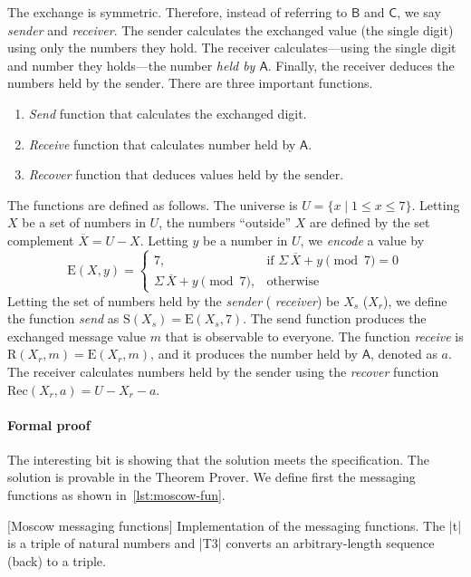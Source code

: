 The exchange is symmetric. Therefore, instead of referring to \(\mathsf{B}\) and
\(\mathsf{C}\), we say \emph{sender} and \emph{receiver}. The sender calculates
the exchanged value (the single digit) using only the numbers they hold. The
receiver calculates---using the single digit and number they holds---the number
\emph{held by \(\mathsf{A}\)}. Finally, the receiver deduces the numbers held by
the sender. There are three important functions.
\begin{enumerate}
\item \emph{Send} function that calculates the exchanged digit.
\item \emph{Receive} function that calculates number held by \(\mathsf{A}\).
\item \emph{Recover} function that deduces values held by the sender.
\end{enumerate}

The functions are defined as follows. The universe is \(U = \{ x \mid 1 \leq x
\leq 7 \}\). Letting \(X\) be a set of numbers in \(U\), the numbers
\enquote{outside} \(X\) are defined by the set complement \(\overline{X} = U -
X\). Letting \(y\) be a number in \(U\), we \emph{encode} a value by
\[\text{E}(X, y) = \begin{cases} 7, & \text{if } \Sigma\,\overline{X} +
y\pmod{7} = 0 \\ \Sigma\,\overline{X} + y\pmod{7}, & \text{otherwise}
\end{cases}\] Letting the set of numbers held by the \emph{sender} (\resp
\emph{receiver}) be \(X_s\) (\resp \(X_r\)), we define the function \emph{send}
as \(\text{S}(X_s) = \text{E}(X_s, 7)\). The send function produces the
exchanged message value \(m\) that is observable to everyone. The function
\emph{receive} is \(\text{R}(X_r,m) = \text{E}(X_r, m)\), and it produces the
number held by \(\mathsf{A}\), denoted as \(a\). The receiver calculates numbers
held by the sender using the \emph{recover} function \(\text{Rec}(X_r, a) = U -
X_r - a\).

\paragraph*{Formal proof}
The interesting bit is showing that the solution meets the specification.
The solution is provable in the  Theorem Prover.
We define first the messaging functions as shown in~\autoref{lst:moscow-fun}.

\begin{center}
\begin{minipage}{\textwidth}
\captionsetup{type=lstlisting}
[Moscow messaging functions]{
   Implementation of the messaging functions. The \pr|t| is a triple of natural
   numbers and \pr|T3| converts an arbitrary-length sequence (back) to a
   triple.}
\label{lst:moscow-fun}
\end{minipage}
\end{center}

